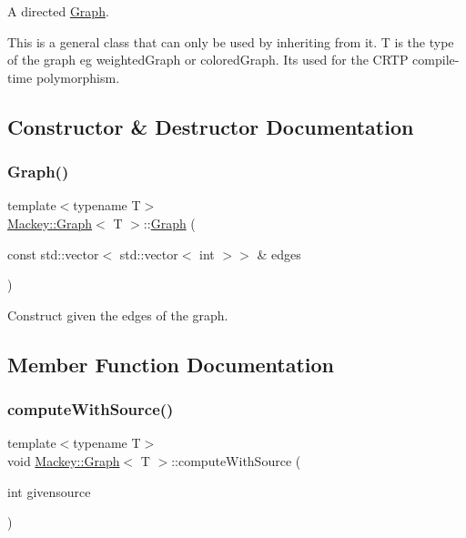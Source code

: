 A directed \hyperlink{classMackey_1_1Graph}{Graph}. 

This is a general class that can only be used by inheriting from it. T is the type of the graph eg weighted\+Graph or colored\+Graph. It\textquotesingle{}s used for the C\+R\+TP compile-\/time polymorphism. 

\subsection{Constructor \& Destructor Documentation}
\mbox{\label{classMackey_1_1Graph_a4f0ca7cec28645835bbad29b8c00992c}} 
\subsubsection{\texorpdfstring{Graph()}{Graph()}}
{\footnotesize\ttfamily template$<$typename T$>$ \\
\hyperlink{classMackey_1_1Graph}{Mackey\+::\+Graph}$<$ T $>$\+::\hyperlink{classMackey_1_1Graph}{Graph} (\begin{DoxyParamCaption}\item[{const std\+::vector$<$ std\+::vector$<$ int $>$$>$ \&}]{edges }\end{DoxyParamCaption})\hspace{0.3cm}{\ttfamily [inline]}}



Construct given the edges of the graph. 



\subsection{Member Function Documentation}
\mbox{\label{classMackey_1_1Graph_acda32cd8d144dcd1ec771bd8d2753321}} 
\subsubsection{\texorpdfstring{compute\+With\+Source()}{computeWithSource()}}
{\footnotesize\ttfamily template$<$typename T$>$ \\
void \hyperlink{classMackey_1_1Graph}{Mackey\+::\+Graph}$<$ T $>$\+::compute\+With\+Source (\begin{DoxyParamCaption}\item[{int}]{givensource }\end{DoxyParamCaption})\hspace{0.3cm}{\ttfamily [inline]}}



